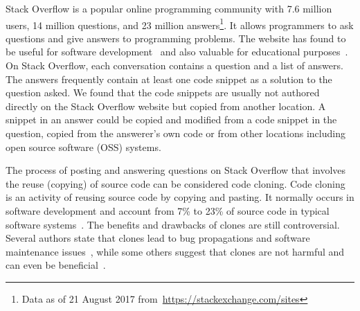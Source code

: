\documentclass[10pt,journal,compsoc]{IEEEtran}
\begin{document}
%
\IEEEpeerreviewmaketitle


Stack Overflow is a popular online programming community with 7.6 million users,
14 million questions, and 23 million answers\footnote{Data as of 21 August 2017
	from~\url{https://stackexchange.com/sites}}. It allows programmers to ask
questions and give answers to programming problems. The website has found to be
useful for software
development~\cite{Ponzanelli2013,Ponzanelli2014,Keivanloo2014,Park2014,
	Stolee2014,Subramanian2013,Diamantopoulos2015,Treude2016} and also valuable for
educational purposes~\cite{Nasehi2012}. On Stack Overflow, each conversation
contains a question and a list of answers. The answers frequently contain at
least one code snippet as a solution to the question asked. We found that the
code snippets are usually not authored directly on the Stack Overflow website
but copied from another location. A snippet in an answer could be copied and
modified from a code snippet in the question, copied from the answerer's own
code or from other locations including open source software (OSS) systems.

The process of posting and answering questions on Stack Overflow that involves
the reuse (copying) of source code can be considered code cloning. Code cloning
is an activity of reusing source code by copying and pasting. It normally occurs
in software development and account from 7\% to 23\% of source code in typical
software systems~\cite{Bellon2007}. The benefits and drawbacks of clones are
still controversial. Several authors state that clones lead to bug propagations
and software maintenance issues~\cite{Kamiya2002}, while some others suggest
that clones are not harmful and can even be
beneficial~\cite{Saini2016,Kapser2006}.
\end{document}
